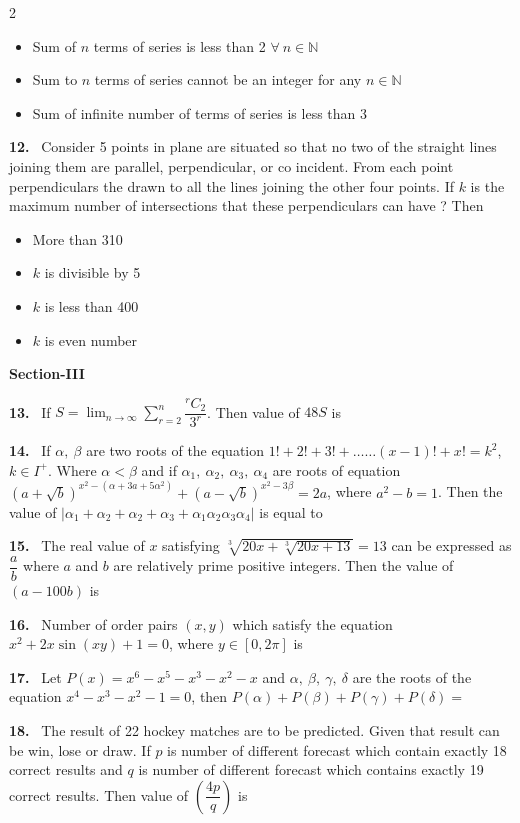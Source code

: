 \documentclass[10pt]{extarticle}
\newcommand{\sect}[1]{\par\smallskip\noindent\textbf{#1}\par}
\newcommand{\qn}[1]{\par\smallskip\noindent\textbf{#1.}~}
\newenvironment{qoptions}{\begin{itemize}[leftmargin=1.8em,itemsep=1pt,topsep=2pt,label={}]}{\end{itemize}}
\newcommand{\opt}[2]{\item[(#1)] #2}
\begin{document}
\begin{multicols}{2}
\begin{qoptions}
\opt{B}{Sum of $n$ terms of series is less than 2 $\forall\ n\in\mathbb N$}
\opt{C}{Sum to $n$ terms of series cannot be an integer for any $n\in\mathbb N$}
\opt{D}{Sum of infinite number of terms of series is less than 3}
\end{qoptions}
\qn{12} Consider 5 points in plane are situated so that no two of the straight lines joining them are parallel, perpendicular, or co incident. From each point perpendiculars the drawn to all the lines joining the other four points. If $k$ is the maximum number of intersections that these perpendiculars can have ? Then
\begin{qoptions}
\opt{A}{More than 310}
\opt{B}{$k$ is divisible by 5}
\opt{C}{$k$ is less than 400}
\opt{D}{$k$ is even number}
\end{qoptions}
\sect{Section-III}
\qn{13} If $S=\displaystyle\lim_{n\to\infty}\sum_{r=2}^{n}\dfrac{{}^rC_2}{3^r}$. Then value of $48S$ is
\qn{14} If $\alpha,\ \beta$ are two roots of the equation $1!+2!+3!+\dots\dots(x-1)!+x!=k^2$, $k\in I^+$. Where $\alpha<\beta$ and if $\alpha_1,\ \alpha_2,\ \alpha_3,\ \alpha_4$ are roots of equation $\left(a+\sqrt b\right)^{x^2-\left(\alpha+3a+5\alpha^2\right)}+\left(a-\sqrt b\right)^{x^2-3\beta}=2a$, where $a^2-b=1$. Then the value of $|\alpha_1+\alpha_2+\alpha_2+\alpha_3+\alpha_1\alpha_2\alpha_3\alpha_4|$ is equal to
\qn{15} The real value of $x$ satisfying $\sqrt[3]{20x+\sqrt[3]{20x+13}}=13$ can be expressed as $\dfrac ab$ where $a$ and $b$ are relatively prime positive integers. Then the value of $(a-100b)$ is
\qn{16} Number of order pairs $(x,y)$ which satisfy the equation $x^2+2x\sin(xy)+1=0$, where $y\in[0,2\pi]$ is
\qn{17} Let $P(x)=x^6-x^5-x^3-x^2-x$ and $\alpha,\ \beta,\ \gamma,\ \delta$ are the roots of the equation $x^4-x^3-x^2-1=0$, then $P(\alpha)+P(\beta)+P(\gamma)+P(\delta)=$
\qn{18} The result of 22 hockey matches are to be predicted. Given that result can be win, lose or draw. If $p$ is number of different forecast which contain exactly 18 correct results and $q$ is number of different forecast which contains exactly 19 correct results. Then value of $\left(\dfrac{4p}{q}\right)$ is
\end{multicols}
\end{document}
